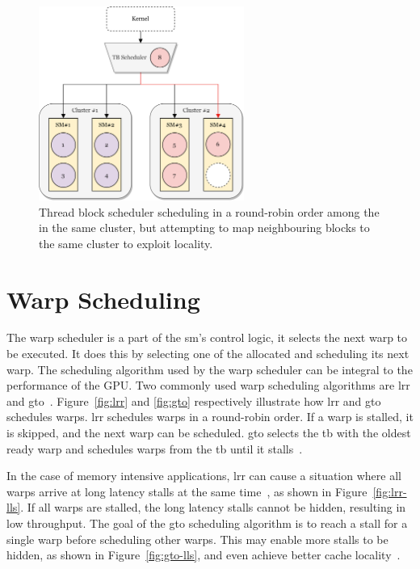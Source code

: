 \begin{figure}
    \centering
    \includegraphics[width=0.6\textwidth]{figures/TB_scheduler.png}
    \caption[\Acrlong{tb} scheduling]{Thread block scheduler scheduling  in a round-robin order among the  in the same cluster, but attempting to map neighbouring blocks to the same cluster to exploit locality.}
    \label{fig:tb_scheduler}
\end{figure}

\newpage
\section{Warp Scheduling} \label{sec:warp_scheduling}

The warp scheduler is a part of the \acrshort{sm}'s control logic, it selects the next warp to be executed. It does this by selecting one of the allocated  and scheduling its next warp. The scheduling algorithm used by the warp scheduler can be integral to the performance of the GPU. Two commonly used warp scheduling algorithms are \acrfull{lrr} and \acrfull{gto}~\cite{improving_gpgpu_scheduling}. Figure~\ref{fig:lrr} and \ref{fig:gto} respectively illustrate how \acrshort{lrr} and \acrshort{gto} schedules warps. \acrshort{lrr} schedules warps in a round-robin order. If a warp is stalled, it is skipped, and the next warp can be scheduled. \acrshort{gto} selects the \acrshort{tb} with the oldest ready warp and schedules warps from the \acrshort{tb} until it stalls~\cite{cache-conscious_wavefront_scheduling}. 

In the case of memory intensive applications, \acrshort{lrr} can cause a situation where all warps arrive at long latency stalls at the same time~\cite{ZHANG2018520}, as shown in Figure~\ref{fig:lrr-lls}. If all warps are stalled, the long latency stalls cannot be hidden, resulting in low throughput. The goal of the \acrshort{gto} scheduling algorithm is to reach a stall for a single warp before scheduling other warps. This may enable more stalls to be hidden, as shown in Figure~\ref{fig:gto-lls}, and even achieve better cache locality~\cite{cache-conscious_wavefront_scheduling, ZHANG2018520}.

